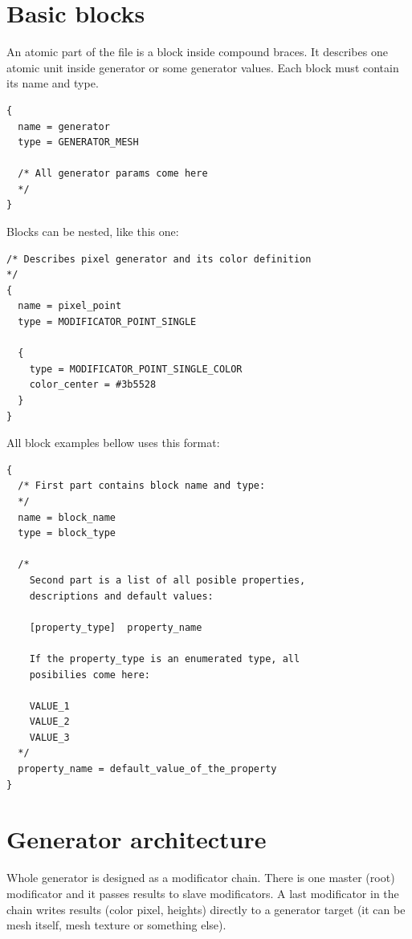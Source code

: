 \documentclass[9pt]{article}
\begin{document}
\section{Basic blocks}
An atomic part of the file is a block inside compound braces. It describes one 
atomic unit inside generator or some generator values. Each block must
contain its name and type.
\begin{verbatim}
{
  name = generator
  type = GENERATOR_MESH

  /* All generator params come here
  */
}
\end{verbatim}
Blocks can be nested, like this one:
\begin{verbatim}
/* Describes pixel generator and its color definition
*/
{
  name = pixel_point
  type = MODIFICATOR_POINT_SINGLE

  {
    type = MODIFICATOR_POINT_SINGLE_COLOR
    color_center = #3b5528
  }
}
\end{verbatim}
All block examples bellow uses this format:
\begin{verbatim}
{
  /* First part contains block name and type:
  */
  name = block_name
  type = block_type

  /*
    Second part is a list of all posible properties,
    descriptions and default values:

    [property_type]  property_name
   
    If the property_type is an enumerated type, all 
    posibilies come here:
    
    VALUE_1
    VALUE_2
    VALUE_3
  */  
  property_name = default_value_of_the_property
}
\end{verbatim}

\section{Generator architecture}
Whole generator is designed as a modificator chain. There is one master (root)
modificator and it passes results to slave modificators. A last modificator 
in the chain writes results (color pixel, heights) directly to a generator target
(it can be mesh itself, mesh texture or something else).

\clearpage
\end{document}
